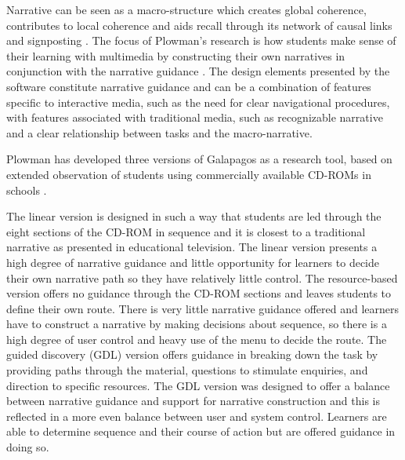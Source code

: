 \documentclass{egpubl}
\begin{document}
Narrative can be seen as a macro-structure which creates global coherence, contributes to local
coherence and aids recall through its network of causal links and signposting \cite{plowman1999}. 
The focus of Plowman's research is how students make sense of their learning with multimedia by constructing their own narratives in conjunction with the narrative guidance \cite{plowman1999}. The design elements presented by the software constitute
narrative guidance and can be a combination of features specific to interactive media, such as the need for clear navigational procedures, with features associated with traditional media, such as recognizable narrative and a clear relationship between tasks and the macro-narrative. 


Plowman has developed three versions of Galapagos as a research tool, based on extended observation of students using commercially available CD-ROMs in schools \cite{plowman1999}.

The linear version is designed in such a way that students are led through the eight sections of the CD-ROM in sequence and it is closest to a traditional narrative as presented in educational television.  The linear version presents a high degree of narrative guidance and little opportunity for learners to decide their own narrative path so they have relatively little control.
The resource-based version offers no guidance through the CD-ROM sections and leaves students to define their own route. There is very
little narrative guidance offered and learners have to construct a narrative by making decisions about sequence, so there is a high degree of user control and heavy use of the menu to decide the route. 
The guided discovery (GDL) version offers guidance in breaking down the task by providing paths through the material, questions to stimulate enquiries, and direction to specific resources. The GDL version was designed to offer a balance between narrative guidance and support for narrative construction and this is reflected in a more even balance between user and system control. Learners are able to determine sequence and their course of action but are offered guidance in doing so. 
\end{document}
